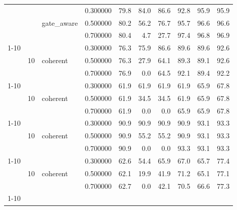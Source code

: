 \begin{tabular}{llllrrrrrr}
 &  & \multirow[t]{3}{*}{gate\_aware} & 0.300000 & 79.8 & 84.0 & 86.6 & 92.8 & 95.9 & 95.9 \\
 &  &  & 0.500000 & 80.2 & 56.2 & 76.7 & 95.7 & 96.6 & 96.6 \\
 &  &  & 0.700000 & 80.4 & 4.7 & 27.7 & 97.4 & 96.8 & 96.9 \\
\cline{1-10} \cline{2-10} \cline{3-10}
\multirow[t]{3}{*}{frozen+weak} & \multirow[t]{3}{*}{10} & \multirow[t]{3}{*}{coherent} & 0.300000 & 76.3 & 75.9 & 86.6 & 89.6 & 89.6 & 92.6 \\
 &  &  & 0.500000 & 76.3 & 27.9 & 64.1 & 89.3 & 89.1 & 92.6 \\
 &  &  & 0.700000 & 76.9 & 0.0 & 64.5 & 92.1 & 89.4 & 92.2 \\
\cline{1-10} \cline{2-10} \cline{3-10}
\multirow[t]{3}{*}{hom\_llama32\_3b} & \multirow[t]{3}{*}{10} & \multirow[t]{3}{*}{coherent} & 0.300000 & 61.9 & 61.9 & 61.9 & 61.9 & 65.9 & 67.8 \\
 &  &  & 0.500000 & 61.9 & 34.5 & 34.5 & 61.9 & 65.9 & 67.8 \\
 &  &  & 0.700000 & 61.9 & 0.0 & 0.0 & 65.9 & 65.9 & 67.8 \\
\cline{1-10} \cline{2-10} \cline{3-10}
\multirow[t]{3}{*}{hom\_qwen38\_27b} & \multirow[t]{3}{*}{10} & \multirow[t]{3}{*}{coherent} & 0.300000 & 90.9 & 90.9 & 90.9 & 90.9 & 93.1 & 93.3 \\
 &  &  & 0.500000 & 90.9 & 55.2 & 55.2 & 90.9 & 93.1 & 93.3 \\
 &  &  & 0.700000 & 90.9 & 0.0 & 0.0 & 93.3 & 93.1 & 93.3 \\
\cline{1-10} \cline{2-10} \cline{3-10}
\multirow[t]{3}{*}{weak} & \multirow[t]{3}{*}{10} & \multirow[t]{3}{*}{coherent} & 0.300000 & 62.6 & 54.4 & 65.9 & 67.0 & 65.7 & 77.4 \\
 &  &  & 0.500000 & 62.1 & 19.9 & 41.9 & 71.2 & 65.1 & 77.1 \\
 &  &  & 0.700000 & 62.7 & 0.0 & 42.1 & 70.5 & 66.6 & 77.3 \\
\cline{1-10} \cline{2-10} \cline{3-10}
\bottomrule
\end{tabular}

